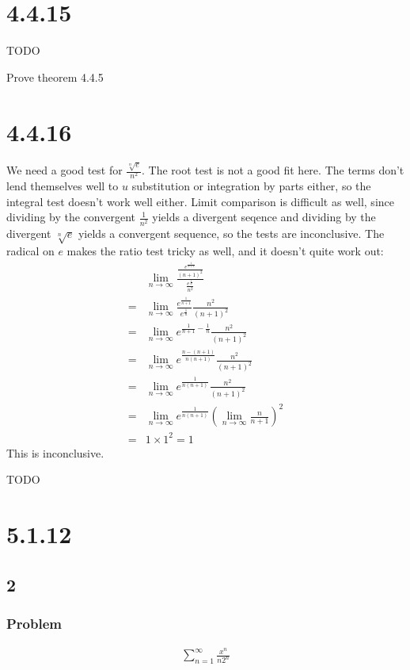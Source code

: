 \documentclass[12pt]{article}
\newcommand{\round}[1]{\left(       #1 \right)      }
\begin{document}
\section*{4.4.15}
TODO

Prove theorem 4.4.5



\section*{4.4.16}
We need a good test for $\frac{\sqrt[n]{e}}{n^2}$. The root test is not a good fit here. The terms don't lend themselves well to $u$ substitution or integration by parts either, so the integral test doesn't work well either. Limit comparison is difficult as well, since dividing by the convergent $\frac{1}{n^2}$ yields a divergent seqence and dividing by the divergent $\sqrt[n]{e}$ yields a convergent sequence, so the tests are inconclusive. The radical on $e$ makes the ratio test tricky as well, and it doesn't quite work out:
\begin{align*}
     & \lim_{n\to\infty} \frac{\frac{e^\frac{1}{n+1}}{(n+1)^2}} {\frac{e^\frac{1}{n}}{n^2}} \\
    =& \lim_{n\to\infty} \frac{e^\frac{1}{n+1}}{e^\frac{1}{n}} \frac{n^2}{(n+1)^2} \\
    =& \lim_{n\to\infty} e^{\frac{1}{n+1} - \frac{1}{n}} \frac{n^2}{(n+1)^2} \\
    =& \lim_{n\to\infty} e^{\frac{n-(n+1)}{n(n+1)}} \frac{n^2}{(n+1)^2} \\
    =& \lim_{n\to\infty} e^{\frac{1}{n(n+1)}} \frac{n^2}{(n+1)^2} \\
    =& \lim_{n\to\infty} e^{\frac{1}{n(n+1)}} \round{ \lim_{n\to\infty} \frac{n}{n+1}}^2 \\
    =& 1 \times 1^2 = 1
\end{align*}
This is inconclusive.

TODO



\section*{5.1.12}

\subsection*{2}
\subsubsection*{Problem}
\begin{align*}
    \sum_{n=1}^\infty \frac{x^n}{n2^n}
\end{align*}
\end{document}
